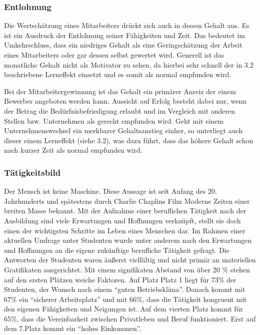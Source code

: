 \subsubsection{Entlohnung}
Die Wertschätzung eines Mitarbeiters drückt sich auch in dessen Gehalt aus. Es ist ein Ausdruck der Entlohnung seiner Fähigkeiten und Zeit. Das bedeutet im Umkehrschluss, dass ein niedriges Gehalt als eine Geringschätzung der Arbeit eines Mitarbeiters oder gar dessen selbst gewertet wird. Generell ist das monatliche Gehalt nicht als Motivator zu sehen, da hierbei sehr schnell der in 3.2 beschriebene Lerneffekt einsetzt und es somit als normal empfunden wird.

Bei der Mitarbeitergewinnung ist das Gehalt ein primärer Anreiz der einem Bewerber angeboten werden kann. Aussicht auf Erfolg besteht dabei nur, wenn der Betrag die Bedürfnisbefriedigung erlaubt und im Vergleich mit anderen Stellen bzw. Unternehmen als gerecht empfunden wird. Geht mit einem Unternehmenswechsel ein merkbarer Gehaltsanstieg einher, so unterliegt auch dieser einem Lerneffekt (siehe 3.2), was dazu führt, dass das höhere Gehalt schon nach kurzer Zeit als normal empfunden wird.

\subsubsection{Tätigkeitsbild}
Der Mensch ist keine Maschine. Diese Aussage ist seit Anfang des 20. Jahrhunderts und spätestens durch Charlie Chaplins Film \glqq Moderne Zeiten\grqq \cite{Chaplin.1936} einer breiten Masse bekannt. 
Mit der Aufnahme einer beruflichen Tätigkeit nach der Ausbildung sind viele Erwartungen und Hoffnungen verknüpft, stellt sie doch einen der wichtigsten Schritte im Leben eines Menschen dar.  
Im Rahmen einer aktuellen Umfrage \citep{Allensbach.2014} unter Studenten wurde unter anderem nach den Erwartungen und Hoffnungen an die eigene zukünftige berufliche Tätigkeit gefragt. Die Antworten der Studenten waren äußerst vielfältig und nicht \glqq primär an materiellen Gratifikaten ausgerichtet\grqq. Mit einem signifikaten Abstand von über 20 \% stehen auf den ersten Plätzen weiche Faktoren. Auf Platz Platz 1 liegt für 73\% der Studenten, der Wunsch nach einem “guten Betriebsklima”. Danach kommt mit 67\% ein “sicherer Arbeitsplatz” und mit 66\%, dass die Tätigkeit kongruent mit den eigenen Fähigkeiten und Neigungen ist. Auf dem vierten Platz kommt für 65\%, dass die Vereinbarkeit zwischen Privatleben und Beruf funktioniert. Erst auf dem 7.Platz kommt ein “hohes Einkommen”.

